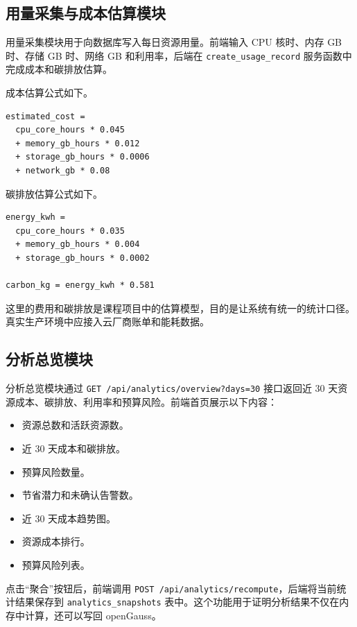 \subsection{用量采集与成本估算模块}\label{ux7528ux91cfux91c7ux96c6ux4e0eux6210ux672cux4f30ux7b97ux6a21ux5757}

用量采集模块用于向数据库写入每日资源用量。前端输入 CPU 核时、内存 GB
时、存储 GB 时、网络 GB 和利用率，后端在 \texttt{create\_usage\_record}
服务函数中完成成本和碳排放估算。

成本估算公式如下。

\begin{verbatim}
estimated_cost =
  cpu_core_hours * 0.045
  + memory_gb_hours * 0.012
  + storage_gb_hours * 0.0006
  + network_gb * 0.08
\end{verbatim}

碳排放估算公式如下。

\begin{verbatim}
energy_kwh =
  cpu_core_hours * 0.035
  + memory_gb_hours * 0.004
  + storage_gb_hours * 0.0002

carbon_kg = energy_kwh * 0.581
\end{verbatim}

这里的费用和碳排放是课程项目中的估算模型，目的是让系统有统一的统计口径。真实生产环境中应接入云厂商账单和能耗数据。

\subsection{分析总览模块}\label{ux5206ux6790ux603bux89c8ux6a21ux5757}

分析总览模块通过 \texttt{GET\ /api/analytics/overview?days=30}
接口返回近 30
天资源成本、碳排放、利用率和预算风险。前端首页展示以下内容：

\begin{itemize}
\tightlist
\item
  资源总数和活跃资源数。
\item
  近 30 天成本和碳排放。
\item
  预算风险数量。
\item
  节省潜力和未确认告警数。
\item
  近 30 天成本趋势图。
\item
  资源成本排行。
\item
  预算风险列表。
\end{itemize}

点击``聚合''按钮后，前端调用
\texttt{POST\ /api/analytics/recompute}，后端将当前统计结果保存到
\texttt{analytics\_snapshots}
表中。这个功能用于证明分析结果不仅在内存中计算，还可以写回 openGauss。

